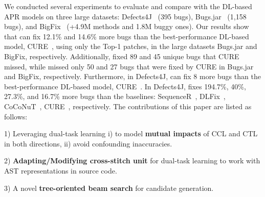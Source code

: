 We conducted several experiments to evaluate and compare {\tool} with
the DL-based APR models on three large datasets:
Defects4J~\cite{defects4j} (395 bugs), Bugs.jar~\cite{saha2018bugs}
(1,158 bugs), and BigFix~\cite{yioopsla19} (+4.9M methods and 1.8M
buggy ones).
Our results show that {\tool} can fix 12.1\% and 14.6\% more bugs than
the best-performance DL-based model, CURE~\cite{cure-icse21}, using
only the Top-1 patches, in the large datasets Bugs.jar and BigFix,
respectively. Additionally, {\tool} fixed 89 and 45 unique bugs that
CURE missed, while {\tool} missed only 50 and 27 bugs that were fixed
by CURE in Bugs.jar and BigFix, respectively.  Furthermore, in
Defects4J, {\tool} can fix 8 more bugs than the best-performance
DL-based model, CURE~\cite{cure-icse21}. In Defects4J, {\tool} fixes
194.7\%, 40\%, 27.3\%, and 16.7\% more bugs than the baselines:
SequenceR~\cite{chen2018sequencer}, DLFix~\cite{icse20},
CoCoNuT~\cite{lutellier2020coconut}, CURE~\cite{cure-icse21},
respectively. The contributions of this paper are listed as follows:




1) Leveraging dual-task learning i) to model {\bf mutual impacts}
of CCL and CTL in both directions, ii) avoid confounding inaccuracies.



2) {\bf Adapting/Modifying cross-stitch unit} for dual-task learning to work
with AST representations in source code.

3) A novel {\bf tree-oriented beam search} for candidate generation.




